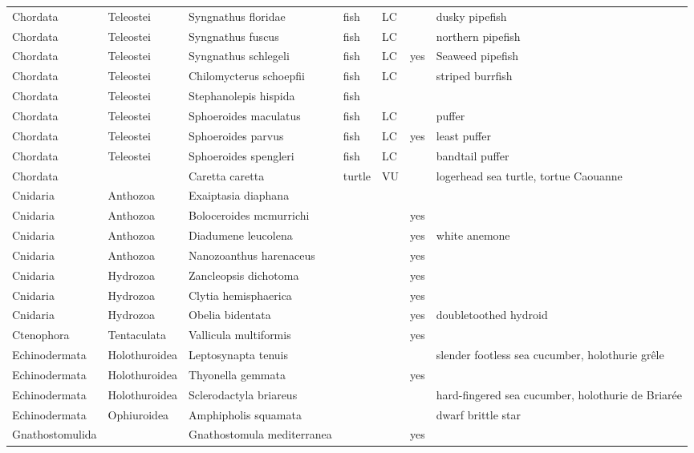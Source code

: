 \begin{longtable}{lllllll}
  Chordata & Teleostei & Syngnathus floridae & fish & LC &  & dusky pipefish \\ 
  Chordata & Teleostei & Syngnathus fuscus & fish & LC &  & northern pipefish \\ 
  Chordata & Teleostei & Syngnathus schlegeli & fish & LC & yes & Seaweed pipefish \\ 
  Chordata & Teleostei & Chilomycterus schoepfii & fish & LC &  & striped burrfish \\ 
  Chordata & Teleostei & Stephanolepis hispida & fish &  &  &  \\ 
  Chordata & Teleostei & Sphoeroides maculatus & fish & LC &  & puffer \\ 
  Chordata & Teleostei & Sphoeroides parvus & fish & LC & yes & least puffer \\ 
  Chordata & Teleostei & Sphoeroides spengleri & fish & LC &  & bandtail puffer \\ 
  Chordata &  & Caretta caretta & turtle & VU &  & logerhead sea turtle, tortue Caouanne \\ 
  Cnidaria & Anthozoa & Exaiptasia diaphana &  &  &  &  \\ 
  Cnidaria & Anthozoa & Boloceroides mcmurrichi &  &  & yes &  \\ 
  Cnidaria & Anthozoa & Diadumene leucolena &  &  & yes & white anemone \\ 
  Cnidaria & Anthozoa & Nanozoanthus harenaceus &  &  & yes &  \\ 
  Cnidaria & Hydrozoa & Zancleopsis dichotoma &  &  & yes &  \\ 
  Cnidaria & Hydrozoa & Clytia hemisphaerica &  &  & yes &  \\ 
  Cnidaria & Hydrozoa & Obelia bidentata &  &  & yes & doubletoothed hydroid \\ 
  Ctenophora & Tentaculata & Vallicula multiformis &  &  & yes &  \\ 
  Echinodermata & Holothuroidea & Leptosynapta tenuis &  &  &  & slender footless sea cucumber, holothurie grêle \\ 
  Echinodermata & Holothuroidea & Thyonella gemmata &  &  & yes &  \\ 
  Echinodermata & Holothuroidea & Sclerodactyla briareus &  &  &  & hard-fingered sea cucumber, holothurie de Briarée \\ 
  Echinodermata & Ophiuroidea & Amphipholis squamata &  &  &  & dwarf brittle star \\ 
  Gnathostomulida &  & Gnathostomula mediterranea &  &  & yes &  \\ 

\end{longtable}
